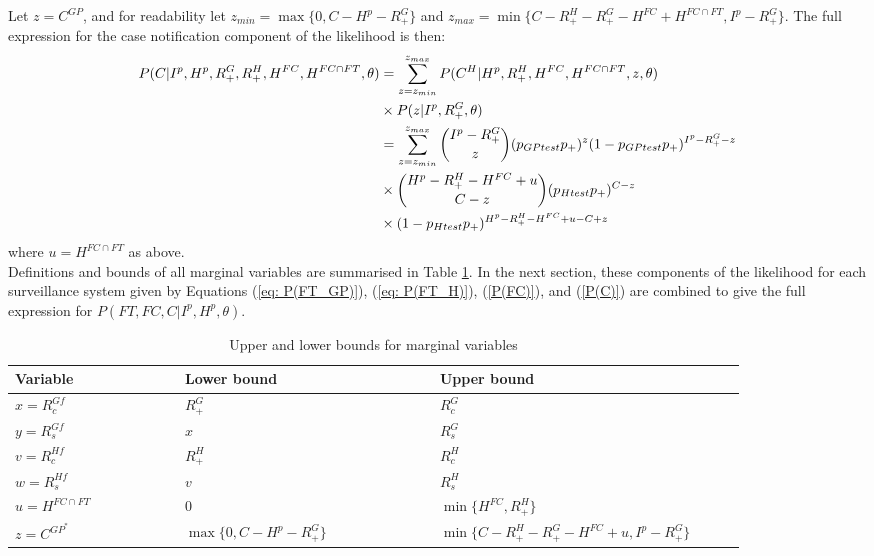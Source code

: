 Let $z=C^{GP}$, and for readability let $z_{min} = \max\{0, C-H^p-R_+^G \}$ and $z_{max} = \min\{C-R_+^H-R_+^G-H^{FC}+H^{FC\cap FT}, I^p-R_+^G\}$. The full expression for the case notification component of the likelihood is then:
\begin{align} \notag
	P(C | I^p, H^p, R_+^G, R_+^H, H^{FC}, H^{FC\cap FT}, \theta) &= \sum_{z=z_{min}}^{z_{max}} P(C^{H} | H^p, R_+^H, H^{FC}, H^{FC\cap FT}, z, \theta) \\ \notag
	&\times P(z | I^p, R_+^G, \theta) \\ \notag
	&= \sum_{z=z_{min}}^{z_{max}} \binom{I^p-R_+^G}{z} (p_{GPtest}p_{+})^{z} (1-p_{GPtest}p_{+})^{I^p-R_+^G-z} \\ \notag
	&\times \binom{H^p-R_+^H-H^{FC}+u}{C-z} (p_{Htest}p_{+})^{C-z} \\ \label{P(C)}
	&\times (1-p_{Htest}p_{+})^{H^p-R_+^H-H^{FC}+u-C+z}
\end{align}
where $u=H^{FC \cap FT}$ as above.\\
Definitions and bounds of all marginal variables are summarised in Table \ref{tab: marginal variables bounds}. In the next section, these components of the likelihood for each surveillance system given by Equations (\ref{eq: P(FT_GP)}), (\ref{eq: P(FT_H)}), (\ref{P(FC)}), and (\ref{P(C)}) are combined to give the full expression for $P(FT,FC,C | I^p, H^p, \theta)$.\\

\begin{table}[h!]
	\centering
	\caption{Upper and lower bounds for marginal variables}
	\begin{tabular}{p{0.2\linewidth}p{0.3\linewidth}p{0.35\linewidth}}
		\toprule
		Variable & Lower bound & Upper bound \\
		\midrule
		$x=R_c^{Gf}$           &  $R_+^G$     & $R_c^G$ \\
		$y=R_s^{Gf}$           &  $x$             & $R_s^G$ \\
		$v = R_c^{Hf}$         &  $R_+^H$     & $R_c^H$ \\
		$w = R_s^{Hf}$         &  $v$             & $R_s^H$ \\
		$u = H^{FC\cap FT}$ &   0                & $\min\{H^{FC}, R_+^H\}$  \\
		$z = C^{GP^*}$           &  $\max\{0, C-H^p-R_+^G\}$ & $\min\{C-R_+^H-R_+^G-H^{FC}+u, I^p-R_+^G\}$ \\
		\bottomrule
	\end{tabular}
	\label{tab: marginal variables bounds}
\end{table}%

